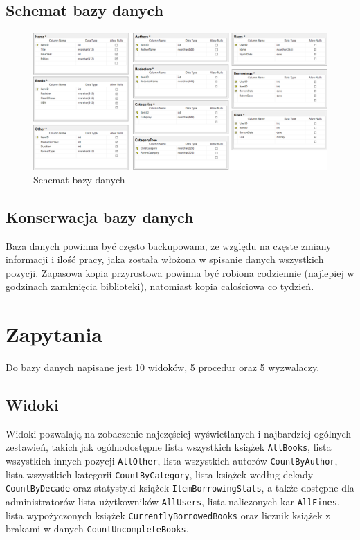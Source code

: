 \documentclass{article}
\renewcommand\t\texttt
\begin{document}
\subsection{Schemat bazy danych}

\begin{figure}[H]
    \centering
    \includegraphics[width=\textwidth]{schemgram.png}
    \caption{Schemat bazy danych}
    \label{sb}
\end{figure}

\subsection{Konserwacja bazy danych}

Baza danych powinna być często backupowana, ze względu na częste zmiany informacji i ilość pracy, jaka została włożona w spisanie danych wszystkich pozycji. Zapasowa kopia przyrostowa powinna być robiona codziennie (najlepiej w godzinach zamknięcia biblioteki), natomiast kopia calościowa co tydzień.


\section{Zapytania}

Do bazy danych napisane jest 10 widoków, 5 procedur oraz 5 wyzwalaczy.

\subsection{Widoki}

Widoki pozwalają na zobaczenie najczęściej wyświetlanych i najbardziej ogólnych zestawień, takich jak ogólnodostępne lista wszystkich książek \t{AllBooks}, lista wszystkich innych pozycji \t{AllOther}, lista wszystkich autorów \t{CountByAuthor}, lista wszystkich kategorii \t{CountByCategory}, lista książek według dekady \t{CountByDecade} oraz statystyki książek \t{ItemBorrowingStats}, a także dostępne dla administratorów lista użytkowników \t{AllUsers}, lista naliczonych kar \t{AllFines}, lista wypożyczonych książek \t{CurrentlyBorrowedBooks} oraz licznik książek z brakami w danych \t{CountUncompleteBooks}.
\end{document}
